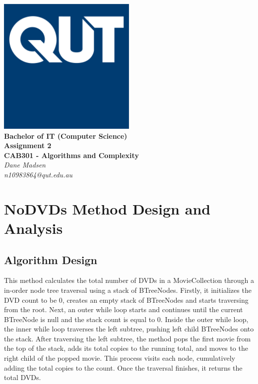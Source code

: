 \documentclass[12pt,a4paper]{article}
\begin{document}
	\begin{titlepage}
		
		\begin{center}
			\includegraphics[width=0.5\textwidth]{QUT.jpg}\\
			[0.03\textheight]  
			\Large\textbf{Bachelor of IT (Computer Science)}\\
			\Large\textbf{Assignment 2}\\
			\large\textbf{CAB301 - Algorithms and Complexity}\\
			[0.02\textheight]
			\large\textsl{Dane Madsen}\\
			\large\textsl{n10983864@qut.edu.au}
		\end{center}
		
	\end{titlepage}
	\tableofcontents
	\newpage
	
	\section{NoDVDs Method Design and Analysis}
		\subsection{Algorithm Design}
			This method calculates the total number of DVDs in a MovieCollection 
			through a in-order node tree traversal using a stack of BTreeNodes. Firstly, 
			it initializes the DVD count to be 0, creates an empty stack of BTreeNodes 
			and starts traversing from the root. Next, an outer while loop starts and 
			continues until the current BTreeNode is null and the stack count is equal 
			to 0. Inside the outer while loop, the inner while loop traverses the left 
			subtree, pushing left child BTreeNodes onto the stack. After traversing the 
			left subtree, the method pops the first movie from the top of the stack, adds 
			its total copies to the running total, and moves to the right child of the popped 
			movie. This process visits each node, cumulatively adding the total copies to 
			the count. Once the traversal finishes, it returns the total DVDs.\\
		
\end{document}
